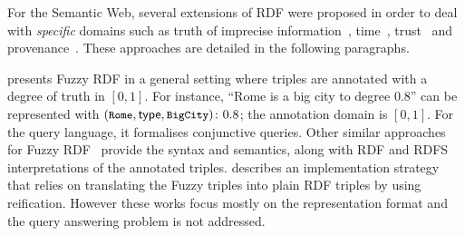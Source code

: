 For the Semantic Web, several extensions of RDF were proposed in order to deal with \emph{specific} domains such as
truth of imprecise
information~\cite{MazzieriDragoni:2008aa,MazzieriDragoni:2005aa,Mazzieri:2004aa,Straccia:2009aa,LvMaYan:2008aa},
time~\cite{GutierrezHurtadoVaisman:2007aa,PuglieseUdreaSubrahmanian:2008aa,TappoletBernstein:2009aa},
trust~\cite{Hartig:2009ab,Schenk:2008aa} and provenance~\cite{DividinoSizovStaab:2009aa}.  These approaches are detailed
in the following paragraphs.


\citet{Straccia:2009aa} presents Fuzzy RDF in a general setting where triples are annotated with a degree of truth in
$[0,1]$. For instance, ``Rome is a big city to degree 0.8'' can be represented with $\mbox{$(\mbox{\small$\mathtt{Rome}$},
    \mathsf{type}, \mbox{\small$\mathtt{BigCity}$})\colon0.8$}$; the annotation domain is $[0,1]$.  For the query language, it formalises conjunctive
queries.
%
Other similar approaches for Fuzzy RDF~\cite{MazzieriDragoni:2008aa,MazzieriDragoni:2005aa,Mazzieri:2004aa} provide the
syntax and semantics, along with RDF and \ac{RDFS} interpretations of the annotated triples.
%
\citet{Mazzieri:2004aa} describes an implementation strategy that relies on translating the Fuzzy triples into plain RDF
triples by using reification.  However these works focus mostly on the representation format and the query answering
problem is not addressed.

